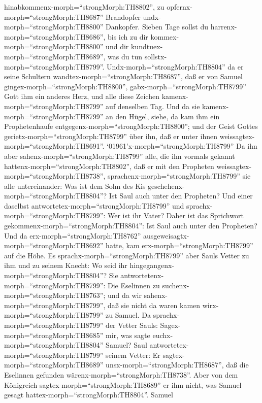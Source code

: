 hinabkommenx-morph=``strongMorph:TH8802'', zu
opfernx-morph=``strongMorph:TH8687'' Brandopfer
undx-morph=``strongMorph:TH8800'' Dankopfer. Sieben Tage sollst du
harrenx-morph=``strongMorph:TH8686'', bis ich zu dir
kommex-morph=``strongMorph:TH8800'' und dir
kundtuex-morph=``strongMorph:TH8689'', was du tun
sollstx-morph=``strongMorph:TH8799''. 
Undx-morph=``strongMorph:TH8804'' da er seine Schultern
wandtex-morph=``strongMorph:TH8687'', daß er von Samuel
gingex-morph=``strongMorph:TH8800'', gabx-morph=``strongMorph:TH8799''
Gott ihm ein anderes Herz, und alle diese Zeichen
kamenx-morph=``strongMorph:TH8799'' auf denselben Tag.  Und
da sie kamenx-morph=``strongMorph:TH8799'' an den Hügel, siehe, da kam
ihm ein Prophetenhaufe entgegenx-morph=``strongMorph:TH8800''; und der
Geist Gottes gerietx-morph=``strongMorph:TH8799'' über ihn, daß er unter
ihnen weissagtex-morph=``strongMorph:TH8691''. 
`01961'\textbar x-morph=``strongMorph:TH8799'' Da ihn aber
sahenx-morph=``strongMorph:TH8799'' alle, die ihn vormals gekannt
hattenx-morph=``strongMorph:TH8802'', daß er mit den Propheten
weissagtex-morph=``strongMorph:TH8738'',
sprachenx-morph=``strongMorph:TH8799'' sie alle untereinander: Was ist
dem Sohn des Kis geschehenx-morph=``strongMorph:TH8804''? Ist Saul auch
unter den Propheten?  Und einer daselbst
antwortetex-morph=``strongMorph:TH8799'' und
sprachx-morph=``strongMorph:TH8799'': Wer ist ihr Vater? Daher ist das
Sprichwort gekommenx-morph=``strongMorph:TH8804'': Ist Saul auch unter
den Propheten?  Und da erx-morph=``strongMorph:TH8762''
ausgeweisagtx-morph=``strongMorph:TH8692'' hatte, kam
erx-morph=``strongMorph:TH8799'' auf die Höhe.  Es
sprachx-morph=``strongMorph:TH8799'' aber Sauls Vetter zu ihm und zu
seinem Knecht: Wo seid ihr hingegangenx-morph=``strongMorph:TH8804''?
Sie antwortetenx-morph=``strongMorph:TH8799'': Die Eselinnen zu
suchenx-morph=``strongMorph:TH8763''; und da wir
sahenx-morph=``strongMorph:TH8799'', daß sie nicht da waren kamen
wirx-morph=``strongMorph:TH8799'' zu Samuel.  Da
sprachx-morph=``strongMorph:TH8799'' der Vetter Sauls:
Sagex-morph=``strongMorph:TH8685'' mir, was sagte
euchx-morph=``strongMorph:TH8804'' Samuel?  Saul
antwortetex-morph=``strongMorph:TH8799'' seinem Vetter: Er
sagtex-morph=``strongMorph:TH8689'' unsx-morph=``strongMorph:TH8687'',
daß die Eselinnen gefunden wärenx-morph=``strongMorph:TH8738''. Aber von
dem Königreich sagtex-morph=``strongMorph:TH8689'' er ihm nicht, was
Samuel gesagt hattex-morph=``strongMorph:TH8804''.  Samuel
